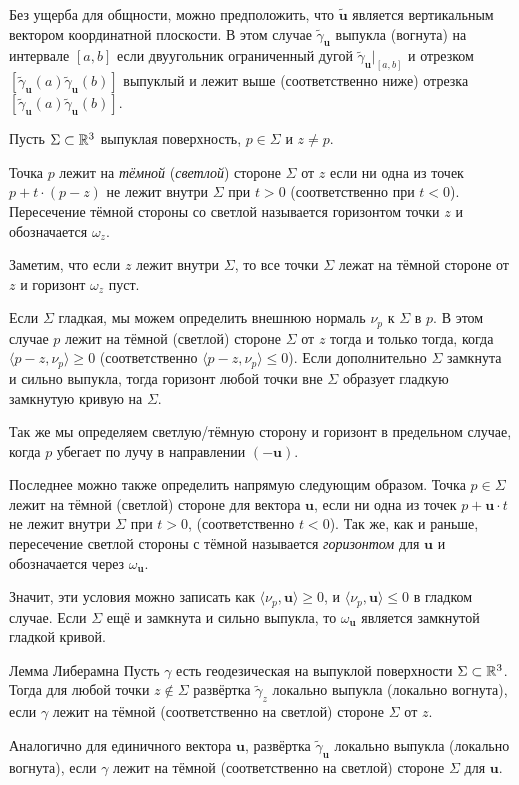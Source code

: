 \documentclass[a4paper,10pt]{article}
\begin{document}
Без ущерба для общности, можно предположить, что $\tilde{\bm{u}}$ является вертикальным вектором координатной плоскости.
В этом случае $\tilde\gamma_{\bm{u}}$ выпукла (вогнута) на интервале $[a,b]$ 
если двуугольник ограниченный дугой $\tilde\gamma_{\bm{u}}|_{[a,b]}$
и отрезком $[\tilde\gamma_{\bm{u}}(a)\tilde\gamma_{\bm{u}}(b)]$
выпуклый и лежит выше (соответственно ниже) отрезка $[\tilde\gamma_{\bm{u}}(a)\tilde\gamma_{\bm{u}}(b)]$.
 
Пусть $\Sigma\subset\mathbb{R}^3$ выпуклая поверхность,
$p\in\Sigma$ и $z\ne p$.

Точка $p$ лежит на \emph{тёмной}  (\emph{светлой}) стороне $\Sigma$ от $z$ 
если ни одна из точек $p+t\cdot(p-z)$ не лежит внутри  $\Sigma$ при $t>0$ (соответственно при $t<0$).
Пересечение тёмной стороны со светлой называется горизонтом точки $z$ и обозначается $\omega_z$.

Заметим, что если $z$ лежит внутри $\Sigma$, 
то все точки $\Sigma$ лежат на тёмной стороне от $z$ и горизонт $\omega_z$ пуст.

Если $\Sigma$ гладкая, мы можем определить внешнюю нормаль $\nu_p$ к $\Sigma$ в $p$.
В этом случае $p$ лежит на тёмной (светлой) стороне $\Sigma$ от $z$
тогда и только тогда, когда $\langle p-z,\nu_p\rangle\ge 0$
(соответственно $\langle p-z,\nu_p\rangle\le 0$).
Если  дополнительно $\Sigma$ замкнута и сильно выпукла, тогда горизонт любой точки вне $\Sigma$
образует гладкую замкнутую кривую на $\Sigma$.

Так же мы определяем светлую/тёмную сторону и горизонт в предельном случае,
когда $p$ убегает по лучу в направлении $(-\bm{u})$.

Последнее можно также определить напрямую следующим образом.
Точка $p\in\Sigma$ лежит на тёмной (светлой) стороне для вектора $\bm{u}$, 
если ни одна из точек $p+\bm{u}\cdot t$ не лежит внутри $\Sigma$ при $t>0$, (соответственно $t<0$).
Так же, как и раньше, пересечение светлой стороны с тёмной называется \emph{горизонтом} для $\bm{u}$ 
и обозначается через $\omega_{\bm{u}}$.

Значит, эти условия можно записать как $\langle \nu_p,\bm{u}\rangle\ge 0$, и $\langle \nu_p,\bm{u}\rangle\le 0$ в гладком случае.
Если $\Sigma$ ещё и замкнута и сильно выпукла, то $\omega_{\bm{u}}$ является замкнутой гладкой кривой.

\begin{thm}{Лемма Либерамна}\label{lem:liberman}
Пусть $\gamma$ есть геодезическая на выпуклой поверхности $\Sigma\subset \mathbb{R}^3$.
Тогда для любой точки $z\notin\Sigma$ развёртка $\tilde\gamma_z$ локально выпукла (локально вогнута), если $\gamma$ лежит на тёмной (соответственно на светлой) стороне $\Sigma$ от $z$.

Аналогично для единичного вектора $\bm{u}$,
развёртка $\tilde\gamma_{\bm{u}}$ локально выпукла (локально вогнута), если $\gamma$ лежит на тёмной (соответственно на светлой) стороне $\Sigma$ для $\bm{u}$.
\end{thm}
\end{document}
